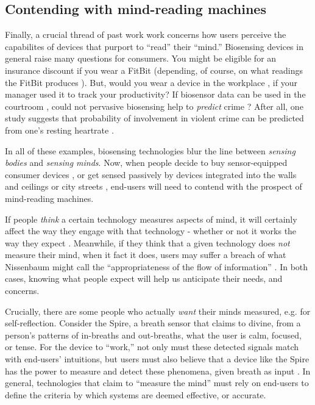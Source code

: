 \documentclass[sigconf]{acmart}
\begin{document}
\subsection{Contending with mind-reading machines}
\label{sec:orgdc80023}

Finally, a crucial thread of past work work concerns how users perceive the capabilites of devices that purport to ``read'' their ``mind.''
Biosensing devices in general raise many questions for consumers.
You might be eligible for an insurance discount if you wear a FitBit \cite{Bernard2015} (depending, of course, on what readings the FitBit produces \cite{Brain2015}). 
But, would you wear a device in the workplace \cite{solon2015}, if your manager used it to track your productivity?
If biosensor data can be used in the courtroom \cite{Crawford2014}, could not pervasive biosensing help to \emph{predict} crime \cite{Thompson2011}? 
After all, one study suggests that probability of involvement in violent crime can be predicted from one's resting heartrate \cite{Latvala2015}. 

In all of these examples, biosensing technologies blur the line between \emph{sensing bodies} and \emph{sensing minds}. 
Now, when people decide to buy sensor-equipped consumer devices \cite{Stables2016}, or get sensed passively by devices integrated into the walls and ceilings \cite{Adib2015} or city streets \cite{Thrift2014}, end-users will need to contend with the prospect of mind-reading machines.

If people \emph{think} a certain technology measures aspects of mind, it will certainly affect the way they engage with that technology - whether or not it works the way they expect \cite{Ali2014a}. Meanwhile, if they think that a given technology does \emph{not} measure their mind, when it fact it does, users may suffer a breach of what Nissenbaum might call the ``appropriateness of the flow of information'' \cite{Doyle2011}. In both cases, knowing what people expect will help us anticipate their needs, and concerns.

Crucially, there are some people who actually \emph{want} their minds measured, e.g. for self-reflection. Consider the Spire, a breath sensor that claims to divine, from a person's patterns of in-breaths and out-breaths, what the user is calm, focused, or tense.
For the device to ``work,'' not only must these detected signals match with end-users' intuitions, but users must also believe that a device like the Spire has the power to measure and detect these phenomena, given breath as input \cite{Ali2014a}. 
In general, technologies that claim to ``measure the mind'' must rely on end-users to define the criteria by which systems are deemed effective, or accurate. 
\end{document}

